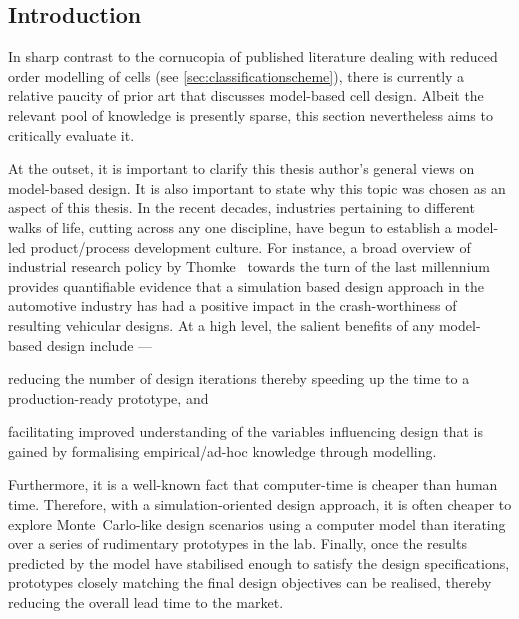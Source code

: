 


\subsection{Introduction}

In  sharp  contrast to  the  cornucopia  of  published literature  dealing  with
reduced order modelling of cells (see \cref{sec:classificationscheme}), there is
currently  a relative  paucity  of  prior art  that  discusses model-based  cell
design. Albeit the relevant pool of  knowledge is presently sparse, this section
nevertheless aims to critically evaluate it.

At the outset, it is important to  clarify this thesis author's general views on
model-based design. It is  also important to state why this  topic was chosen as
an  aspect of  this  thesis. In  the recent  decades,  industries pertaining  to
different  walks of  life,  cutting across  any one  discipline,  have begun  to
establish a model-led product/process development culture. For instance, a broad
overview of  industrial research policy by  Thomke~\cite{Thomke1998} towards the
turn of  the last  millennium provides quantifiable  evidence that  a simulation
based design  approach in the automotive  industry has had a  positive impact in
the  crash-worthiness of  resulting  vehicular  designs. At  a  high level,  the
salient benefits of any model-based design include ---
\begin{enumerate*}[label=\itshape\alph*\upshape)]
    \item reducing the number of design iterations thereby speeding up the time to a production-ready prototype, and
    \item facilitating improved understanding of the variables influencing design that is gained by formalising empirical/ad-hoc knowledge through modelling.
\end{enumerate*}
Furthermore, it  is a well-known fact  that computer-time is cheaper  than human
time. Therefore, with a simulation-oriented design approach, it is often cheaper
to  explore  Monte~Carlo-like  design  scenarios using  a  computer  model  than
iterating over a series of rudimentary  prototypes in the lab. Finally, once the
results predicted  by the  model have  stabilised enough  to satisfy  the design
specifications, prototypes closely  matching the final design  objectives can be
realised, thereby reducing the overall lead time to the market.

